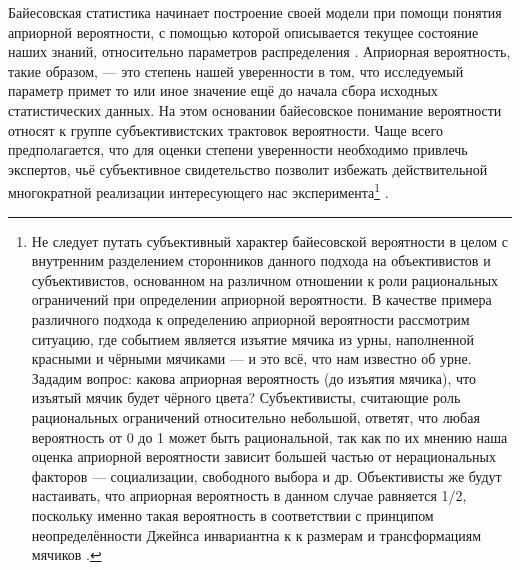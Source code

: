 Байесовская статистика начинает построение своей модели при помощи понятия априорной вероятности, с помощью которой описывается текущее состояние наших знаний, относительно параметров распределения \cite[стр. 18]{Christensen2010}. Априорная вероятность, такие образом, --- это степень нашей уверенности в том, что исследуемый параметр примет то или иное значение ещё до начала сбора исходных статистических данных. На этом основании байесовское понимание вероятности относят к группе субъективистских трактовок вероятности. Чаще всего предполагается, что для оценки степени уверенности необходимо привлечь экспертов, чьё субъективное свидетельство позволит избежать действительной многократной реализации интересующего нас эксперимента\footnote{Не следует путать субъективный характер байесовской вероятности в целом с внутренним разделением сторонников данного подхода на объективистов и субъективистов, основанном на различном отношении к роли рациональных ограничений при определении априорной вероятности. В качестве примера различного подхода к определению априорной вероятности рассмотрим ситуацию, где событием является изъятие мячика из урны, наполненной красными и чёрными мячиками --- и это всё, что нам известно об урне. Зададим вопрос: какова априорная вероятность (до изъятия мячика), что изъятый мячик будет чёрного цвета? Субъективисты, считающие роль рациональных ограничений относительно небольшой, ответят, что любая вероятность от 0 до 1 может быть рациональной, так как по их мнению наша оценка априорной вероятности зависит большей частью от нерациональных факторов --- социализации, свободного выбора и др. Объективисты же будут настаивать, что априорная вероятность в данном случае равняется 1/2, поскольку именно такая вероятность в соответствии с принципом неопределённости Джейнса инвариантна к к размерам и трансформациям мячиков \cite{Talbott2013}.} \cite[стр. 34]{Aivazyan2001}.

